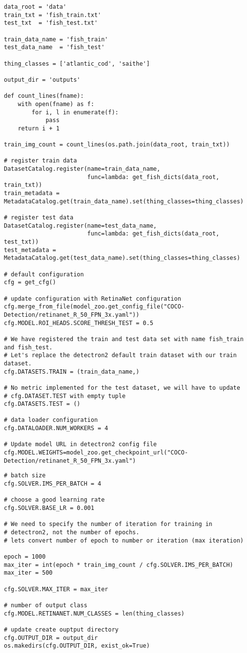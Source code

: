 \begin{verbatim}
data_root = 'data'
train_txt = 'fish_train.txt'
test_txt  = 'fish_test.txt'

train_data_name = 'fish_train'
test_data_name  = 'fish_test'

thing_classes = ['atlantic_cod', 'saithe']

output_dir = 'outputs'

def count_lines(fname):
    with open(fname) as f:
        for i, l in enumerate(f):
            pass
    return i + 1

train_img_count = count_lines(os.path.join(data_root, train_txt))

# register train data
DatasetCatalog.register(name=train_data_name,
                        func=lambda: get_fish_dicts(data_root, train_txt))
train_metadata = MetadataCatalog.get(train_data_name).set(thing_classes=thing_classes)

# register test data
DatasetCatalog.register(name=test_data_name,
                        func=lambda: get_fish_dicts(data_root, test_txt))
test_metadata = MetadataCatalog.get(test_data_name).set(thing_classes=thing_classes)

# default configuration
cfg = get_cfg()

# update configuration with RetinaNet configuration
cfg.merge_from_file(model_zoo.get_config_file("COCO-Detection/retinanet_R_50_FPN_3x.yaml"))
cfg.MODEL.ROI_HEADS.SCORE_THRESH_TEST = 0.5

# We have registered the train and test data set with name fish_train and fish_test.
# Let's replace the detectron2 default train dataset with our train dataset.
cfg.DATASETS.TRAIN = (train_data_name,)

# No metric implemented for the test dataset, we will have to update
# cfg.DATASET.TEST with empty tuple
cfg.DATASETS.TEST = ()

# data loader configuration
cfg.DATALOADER.NUM_WORKERS = 4

# Update model URL in detectron2 config file
cfg.MODEL.WEIGHTS=model_zoo.get_checkpoint_url("COCO-Detection/retinanet_R_50_FPN_3x.yaml")
\end{verbatim}

\label{lst:train}
\begin{verbatim}
# batch size
cfg.SOLVER.IMS_PER_BATCH = 4

# choose a good learning rate
cfg.SOLVER.BASE_LR = 0.001

# We need to specify the number of iteration for training in
# detectron2, not the number of epochs.
# lets convert number of epoch to number or iteration (max iteration)

epoch = 1000
max_iter = int(epoch * train_img_count / cfg.SOLVER.IMS_PER_BATCH)
max_iter = 500

cfg.SOLVER.MAX_ITER = max_iter

# number of output class
cfg.MODEL.RETINANET.NUM_CLASSES = len(thing_classes)

# update create ouptput directory
cfg.OUTPUT_DIR = output_dir
os.makedirs(cfg.OUTPUT_DIR, exist_ok=True)
\end{verbatim}

